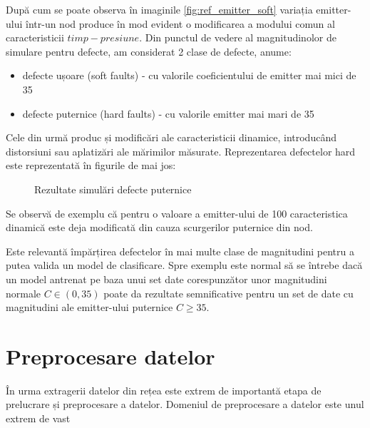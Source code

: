 După cum se poate observa în imaginile \ref{fig:ref_emitter_soft} variația emitter-ului într-un nod produce în mod evident o modificarea a modului comun al caracteristicii $timp-presiune$. Din punctul de vedere al magnitudinolor de simulare pentru defecte, am considerat 2 clase de defecte, anume:
\begin{itemize}
\item defecte ușoare (soft faults) - cu valorile coeficientului de emitter mai mici de 35
\item defecte puternice (hard faults) - cu valorile emitter mai mari de 35 
\end{itemize}

Cele din urmă produc și modificări ale caracteristicii dinamice, introducând distorsiuni sau aplatizări ale mărimilor măsurate. Reprezentarea defectelor hard este reprezentată în figurile de mai jos:

\begin{figure}[H]

\qquad
{}

\caption{Rezultate simulări defecte puternice}
\label{fig:ref_emitter_hard}
\end{figure}

Se observă de exemplu că pentru o valoare a emitter-ului de 100 caracteristica dinamică este deja modificată din cauza scurgerilor puternice din nod. 

Este relevantă împărțirea defectelor în mai multe clase de magnitudini pentru a putea valida un model de clasificare. Spre exemplu este normal să se întrebe dacă un model antrenat pe baza unui set date corespunzător unor magnitudini normale $C \in (0, 35)$ poate da rezultate semnificative pentru un set de date cu magnitudini ale emitter-ului puternice $C \geqslant 35$. 

\section{Preprocesare datelor}
În urma extragerii datelor din rețea este extrem de importantă etapa de prelucrare și preprocesare a datelor. Domeniul de preprocesare a datelor este unul extrem de vast 

